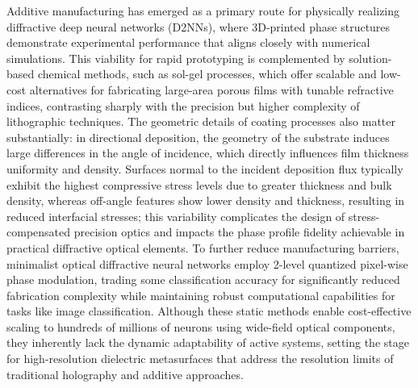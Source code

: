 \documentclass[11pt]{article}
\begin{document}
Additive manufacturing has emerged as a primary route for physically realizing diffractive deep neural networks (D2NNs), where 3D-printed phase structures demonstrate experimental performance that aligns closely with numerical simulations. This viability for rapid prototyping is complemented by solution-based chemical methods, such as sol-gel processes, which offer scalable and low-cost alternatives for fabricating large-area porous films with tunable refractive indices, contrasting sharply with the precision but higher complexity of lithographic techniques. The geometric details of coating processes also matter substantially: in directional deposition, the geometry of the substrate induces large differences in the angle of incidence, which directly influences film thickness uniformity and density. Surfaces normal to the incident deposition flux typically exhibit the highest compressive stress levels due to greater thickness and bulk density, whereas off-angle features show lower density and thickness, resulting in reduced interfacial stresses; this variability complicates the design of stress-compensated precision optics and impacts the phase profile fidelity achievable in practical diffractive optical elements. To further reduce manufacturing barriers, minimalist optical diffractive neural networks employ 2-level quantized pixel-wise phase modulation, trading some classification accuracy for significantly reduced fabrication complexity while maintaining robust computational capabilities for tasks like image classification. Although these static methods enable cost-effective scaling to hundreds of millions of neurons using wide-field optical components, they inherently lack the dynamic adaptability of active systems, setting the stage for high-resolution dielectric metasurfaces that address the resolution limits of traditional holography and additive approaches. \citep{doi_10_1126_science_aat8084_e055772d} \citep{doi_10_1038_s41598_025_33607_1_2162f081} \citep{doi_10_1002_lpor_202402303_1f555bd4} \citep{doi_10_1116_1_5011790_9ce3fdef}
\end{document}
